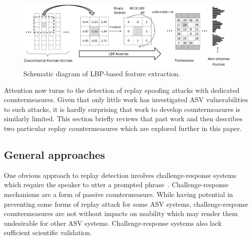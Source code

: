 \begin{figure}
	\includegraphics[width=1\linewidth]{Figs/LBP_idea.png}
	\caption{Schematic diagram of LBP-based feature extraction.}
	\label{fig:LBPfeature}
\end{figure}

Attention now turns to the detection of replay spoofing attacks with dedicated countermeasures.  Given that only little work has investigated ASV vulnerabilities to such attacks, it is hardly surprising that work to develop countermeasures is similarly limited.  This section briefly reviews that past work and then describes two particular replay countermeasures which are explored further in this paper.



\subsection{General approaches}

One obvious approach to replay detection involves challenge-response systems which require the speaker to utter a prompted phrase~\cite{Petrovska1998}. 
Challenge-response mechanisms are a form of passive countermeasure.
While having potential in preventing some forms of replay attack for some ASV systems, challenge-response countermeasures are not without impacts on usability which may render them undesirable for other ASV systems.  Challenge-response systems also lack sufficient scientific validation.


